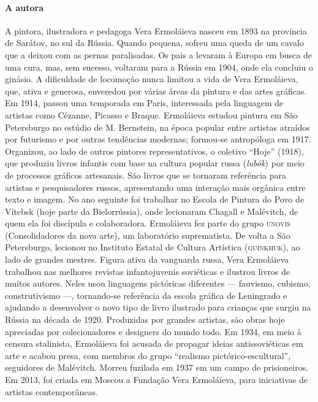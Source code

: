 \documentclass[11pt]{extarticle}
\begin{document}
\paragraph{A autora} A pintora, ilustradora e pedagoga Vera Ermoláieva nasceu em 1893 na província de Sarátov, no sul da Rússia. Quando pequena, sofreu uma queda de um cavalo que a deixou com as pernas paralisadas. Os pais a levaram à Europa em busca de uma cura, mas, sem sucesso, voltaram para a Rússia em 1904, onde ela concluiu o ginásio. A dificuldade de locomoção nunca limitou a vida de Vera Ermoláieva, que, ativa e generosa, enveredou por várias áreas da pintura e das artes gráficas.
Em 1914, passou uma temporada em Paris, interessada pela linguagem de artistas
como Cézanne, Picasso e Braque. Ermoláieva estudou pintura em São Petersburgo no estúdio de M. Bernstein, na época popular entre artistas atraídos por futurismo e por outras tendências modernas; formou-se antropóloga em 1917. Organizou, ao lado de outros pintores representativos, o coletivo “Hoje” (1918), que produziu livros infantis com base na cultura popular russa (\textit{lubók}) por meio
de processos gráficos artesanais. São livros que se tornaram referência para artistas e
pesquisadores russos, apresentando uma interação mais orgânica entre texto e imagem. No
ano seguinte foi trabalhar no Escola de Pintura do Povo de Vítebsk (hoje parte da  Bielorrússia), onde
lecionaram Chagall e Malévitch, de quem ela foi discípula e colaboradora. Ermoláieva fez parte
do grupo \textsc{unovis} (Consolidadores da nova arte), um laboratório suprematista. De volta a São
Petersburgo, lecionou no Instituto Estatal de Cultura Artística (\textsc{guinkhuk}), ao lado de
grandes mestres.
Figura ativa da vanguarda russa, Vera Ermoláieva trabalhou nas melhores revistas
infantojuvenis soviéticas e ilustrou livros de muitos autores. Neles usou linguagens pictóricas diferentes --- fauvismo, cubismo, construtivismo ---, tornando-se referência da escola gráfica de Leningrado e ajudando a desenvolver o novo tipo de livro ilustrado para crianças que surgiu na
Rússia na década de 1920. Produzidas por grandes artistas, são obras hoje apreciadas por
colecionadores e designers do mundo todo.
Em 1934, em meio à censura stalinista, Ermoláieva foi acusada de propagar ideias
antissoviéticas em arte e acabou presa, com membros do grupo “realismo pictórico-escultural”, seguidores de Malévitch. Morreu fuzilada em 1937 em um campo de prisioneiros.
Em 2013, foi criada em Moscou a Fundação Vera Ermoláieva, para iniciativas de artistas
contemporâneas.
\end{document}
